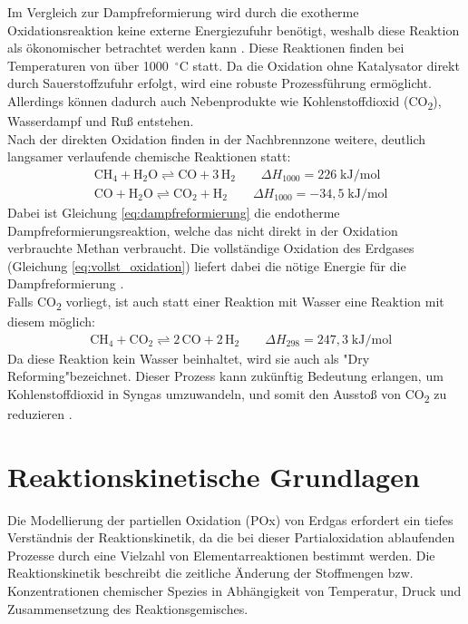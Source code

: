             Im Vergleich zur Dampfreformierung wird durch die exotherme Oxidationsreaktion keine externe Energiezufuhr benötigt, weshalb diese Reaktion als ökonomischer betrachtet werden kann \parencite[S. 6]{en16062916}.
            Diese Reaktionen finden bei Temperaturen von über 1000~$^\circ$C statt. Da die Oxidation ohne Katalysator direkt durch Sauerstoffzufuhr erfolgt, wird eine robuste Prozessführung ermöglicht. Allerdings können dadurch auch Nebenprodukte wie Kohlenstoffdioxid (CO\textsubscript{2}), Wasserdampf und Ruß entstehen.\\
            Nach der direkten Oxidation finden in der Nachbrennzone weitere, deutlich langsamer verlaufende chemische Reaktionen statt:
            \begin{align}
                &\mathrm{CH_4 + H_2O \rightleftharpoons CO + 3\,H_2} \qquad \Delta H_{1000} = 226 \;\mathrm{kJ/mol} \label{eq:dampfreformierung}\\
                &\mathrm{CO + H_2O \rightleftharpoons CO_2 + H_2} \qquad \Delta H_{1000} = -34,5 \;\mathrm{kJ/mol}\label{eq:wassergas_shift}
            \end{align}
            Dabei ist Gleichung \ref{eq:dampfreformierung} die endotherme Dampfreformierungsreaktion, welche das nicht direkt in der Oxidation verbrauchte Methan verbraucht. Die vollständige Oxidation des Erdgases (Gleichung \ref{eq:vollst_oxidation}) liefert dabei die nötige Energie für die Dampfreformierung \cite{POX_Erdgas}.\\ 
            Falls CO\textsubscript{2} vorliegt, ist auch statt einer Reaktion mit Wasser eine Reaktion mit diesem möglich:
            \begin{align}
                &\mathrm{CH_4 + CO_2 \rightleftharpoons 2\,CO + 2\,H_2} \qquad \Delta H_{298} = 247,3 \;\mathrm{kJ/mol} \label{eq:dampfreformierung}
            \end{align}
            Da diese Reaktion kein Wasser beinhaltet, wird sie auch als "Dry Reforming"\;bezeichnet. Dieser Prozess kann zukünftig Bedeutung erlangen, um Kohlenstoffdioxid in Syngas umzuwandeln, und somit den  Ausstoß von CO\textsubscript{2} zu reduzieren \cite{LESACHE2022100970}. 
        \section{Reaktionskinetische Grundlagen}
            Die Modellierung der partiellen Oxidation (POx) von Erdgas erfordert ein tiefes Verständnis der Reaktionskinetik, da die bei dieser Partialoxidation ablaufenden Prozesse durch eine Vielzahl von Elementarreaktionen bestimmt werden. Die Reaktionskinetik beschreibt die zeitliche Änderung der Stoffmengen bzw. Konzentrationen chemischer Spezies in Abhängigkeit von Temperatur, Druck und Zusammensetzung des Reaktionsgemisches. 
